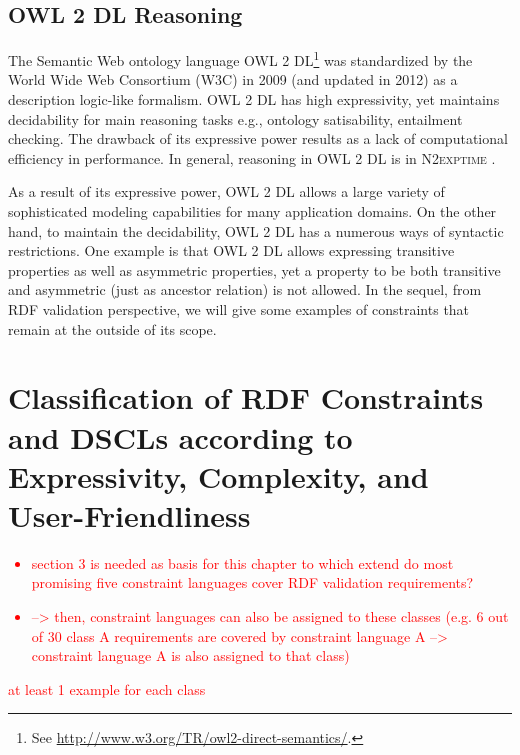 \documentclass{llncs}
\newcommand{\tb}[1]{\todo[size=\small, color=green!40]{\textbf{Thomas:} #1}}
\begin{document}
\subsection{OWL 2 DL Reasoning}


The Semantic Web ontology language OWL 2 DL\footnote{See \url{http://www.w3.org/TR/owl2-direct-semantics/}.} was standardized by
the World Wide Web Consortium (W3C) in 2009 (and updated in 2012) as a
description logic-like formalism.  OWL 2 DL has high expressivity, yet maintains  decidability for main reasoning tasks e.g., ontology satisability, 
entailment checking. The drawback of its expressive power results as a lack of computational efficiency in performance. In general, reasoning in OWL 2 DL is in \textsc{N2exptime} \cite{owl2profiles2008}. 

As a result of its expressive power, OWL 2 DL allows a large variety of sophisticated modeling capabilities for many application domains.  On the other hand, to maintain the decidability, OWL 2 DL has a numerous ways of syntactic restrictions. One example is that OWL 2 DL allows  expressing transitive properties as well as asymmetric properties, yet a property to be both transitive and asymmetric (just as ancestor relation) is not allowed. In the sequel, from RDF validation perspective, we will give some examples of constraints that remain at the outside of its scope. 

\section{Classification of RDF Constraints and DSCLs according to Expressivity, Complexity, and User-Friendliness}

\textcolor{red}{
\begin{itemize}
	\item section 3 is needed as basis for this chapter to which extend do most promising five constraint languages cover RDF validation requirements?
	\item --> then, constraint languages can also be assigned to these classes (e.g. 6 out of 30 class A requirements are covered by constraint language A --> constraint language A is also assigned to that class)
\end{itemize}
}

\textcolor{red}{at least 1 example for each class}

\end{document}
